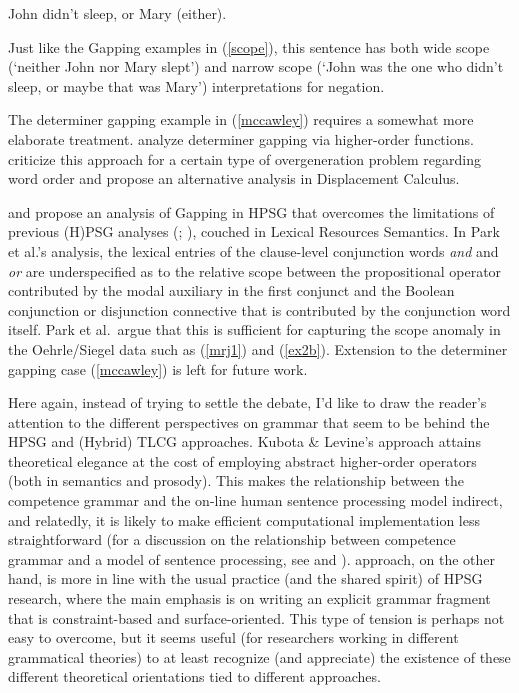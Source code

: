 \documentclass[output=paper
                ,modfonts
 	        ,biblatex
                ,babelshorthands
                ,newtxmath
                ,draftmode
                ,colorlinks, citecolor=brown
]{langscibook}
\begin{document}
\begin{exe}
 \ex   John didn't sleep, or Mary (either).
\end{exe}
Just like the Gapping examples in (\ref{scope}), this sentence has
both wide scope (`neither John nor Mary slept') and narrow scope
(`John was the one who didn't sleep, or maybe that was Mary')
interpretations for negation.

The determiner gapping example in (\ref{mccawley}) requires a somewhat more
elaborate treatment. \citet{kubota-levine-gapping} analyze determiner
gapping via higher-order functions. \citet{morrillvalentin16} criticize this
approach for a certain type of overgeneration problem regarding word
order and propose an alternative analysis in Displacement Calculus.

\citet{parkea18gapping} and \citet{parkDiss} propose an analysis of Gapping in HPSG that
overcomes the limitations of previous (H)PSG analyses 
(\citealt[Section~4.3]{sgww};  \citealt{chaves05,abeille-ea}), couched in Lexical Resources Semantics.
In Park et al.'s analysis, the lexical entries of the clause-level conjunction
words \textit{and} and \textit{or} are underspecified as to the relative scope
between the propositional operator contributed by the modal auxiliary
in the first conjunct and the Boolean conjunction or disjunction
connective that is contributed by the conjunction word itself. Park et
al.\ argue that this is sufficient for capturing the scope anomaly in the
Oehrle/Siegel data such as (\ref{mrj1}) and (\ref{ex2b}). Extension to
the determiner gapping case (\ref{mccawley}) is left for future work.

Here again, instead of trying to settle the debate, I'd like to draw
the reader's attention to the different perspectives on grammar that
seem to be behind the HPSG and (Hybrid) TLCG approaches. Kubota \&
Levine's approach attains theoretical elegance at the cost of
employing abstract higher-order operators (both in semantics and
prosody). This makes the relationship between the competence grammar
and the on-line human sentence processing model indirect, and
relatedly, it is likely to make efficient computational implementation
less straightforward (for a discussion on the relationship between
competence grammar and a model of sentence processing, see
 and ).
 approach, on the 
other hand, is more in line with the usual practice (and the shared
spirit) of HPSG research, where the main emphasis is on writing an
explicit grammar fragment that is constraint-based and
surface-oriented. This type of tension is perhaps not easy to
overcome, but it seems useful (for researchers working in different
grammatical theories) to at least recognize (and appreciate) the
existence of these different theoretical orientations tied to
different approaches.
\end{document}
